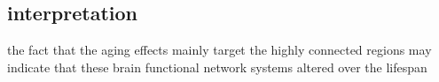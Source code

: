 \subsection{interpretation}

the fact that the aging effects mainly target the highly connected regions
may indicate that these brain functional network systems altered over the 
lifespan
\cite{Cao2014}


